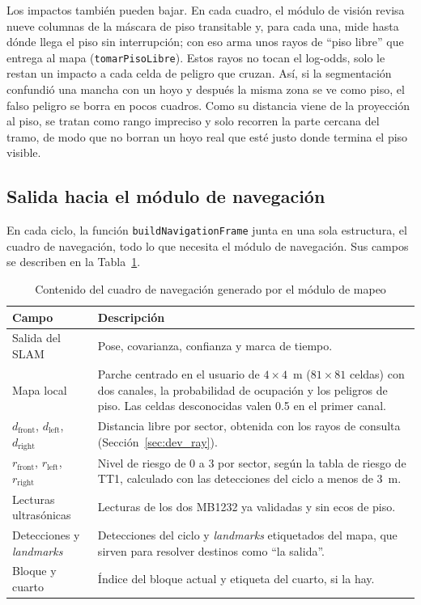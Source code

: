 Los impactos también pueden bajar. En cada cuadro, el módulo de visión revisa nueve
columnas de la máscara de piso transitable y, para cada una, mide hasta dónde llega el
piso sin interrupción; con eso arma unos rayos de ``piso libre'' que entrega al mapa
(\texttt{tomarPisoLibre}). Estos rayos no tocan el log-odds, solo le restan un impacto a
cada celda de peligro que cruzan. Así, si la segmentación confundió una mancha con un
hoyo y después la misma zona se ve como piso, el falso peligro se borra en pocos
cuadros. Como su distancia viene de la proyección al piso, se tratan como rango
impreciso y solo recorren la parte cercana del tramo, de modo que no borran un hoyo real
que esté justo donde termina el piso visible.

\subsection{Salida hacia el módulo de navegación}

En cada ciclo, la función \texttt{buildNavigationFrame} junta en una sola estructura, el
cuadro de navegación, todo lo que necesita el módulo de navegación. Sus campos se
describen en la Tabla~\ref{tab:nav_frame}.

\begin{table}[H]
\centering
\caption{Contenido del cuadro de navegación generado por el módulo de mapeo}
\label{tab:nav_frame}
\renewcommand{\arraystretch}{1.25}
\begin{tabular}{|p{4.2cm}|p{10.3cm}|}
\hline
\textbf{Campo} & \textbf{Descripción} \\
\hline
Salida del SLAM & Pose, covarianza, confianza y marca de tiempo. \\
\hline
Mapa local & Parche centrado en el usuario de $4 \times 4$~m ($81 \times 81$ celdas)
con dos canales, la probabilidad de ocupación y los peligros de piso. Las celdas
desconocidas valen 0.5 en el primer canal. \\
\hline
$d_{\text{front}}$, $d_{\text{left}}$, $d_{\text{right}}$ & Distancia libre por sector,
obtenida con los rayos de consulta (Sección~\ref{sec:dev_ray}). \\
\hline
$r_{\text{front}}$, $r_{\text{left}}$, $r_{\text{right}}$ & Nivel de riesgo de 0 a 3
por sector, según la tabla de riesgo de TT1, calculado con las detecciones del ciclo a
menos de 3~m. \\
\hline
Lecturas ultrasónicas & Lecturas de los dos MB1232 ya validadas y sin ecos de piso. \\
\hline
Detecciones y \emph{landmarks} & Detecciones del ciclo y \emph{landmarks}
etiquetados del mapa, que sirven para resolver destinos como ``la salida''. \\
\hline
Bloque y cuarto & Índice del bloque actual y etiqueta del cuarto, si la hay. \\
\hline
\end{tabular}
\end{table}

